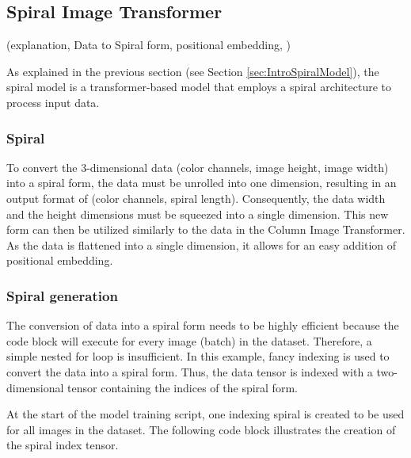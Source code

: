 \newpage


\subsection{Spiral Image Transformer}
    (explanation, Data to Spiral form, positional embedding, )

    As explained in the previous section (see Section \ref{sec:IntroSpiralModel}), the spiral model is a transformer-based model that employs a spiral architecture to process input data. 

    \subsubsection{Spiral}

    To convert the 3-dimensional data (color channels, image height, image width) into a spiral form, the data must be unrolled into one dimension, resulting in an output format of (color channels, spiral length). Consequently, the data width and the height dimensions must be squeezed into a single dimension. This new form can then be utilized similarly to the data in the Column Image Transformer. As the data is flattened into a single dimension, it allows for an easy addition of positional embedding.

    \subsubsection{Spiral generation}

    The conversion of data into a spiral form needs to be highly efficient because the code block will execute for every image (batch) in the dataset. Therefore, a simple nested for loop is insufficient. In this example, fancy indexing is used to convert the data into a spiral form. Thus, the data tensor is indexed with a two-dimensional tensor containing the indices of the spiral form.

    At the start of the model training script, one indexing spiral is created to be used for all images in the dataset. The following code block illustrates the creation of the spiral index tensor.

